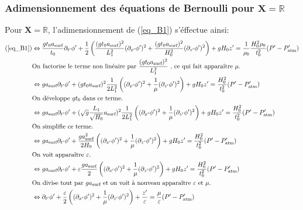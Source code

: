 \documentclass[12pt,a4paper]{article}
\numberwithin{equation}{section}
\begin{document}
\subsubsection{Adimensionnement des équations de Bernoulli pour $\textbf{X} = \mathbb{R}$}
Pour $\textbf{X} = \mathbb{R}$, l'adimensionnement de (\ref{eq_B1}) s'éffectue ainsi:
\begin{align}
    \text{(\ref{eq_B1})} &\Leftrightarrow \frac{g t_0 a_{\text{surf}}}{t_0}\partial_{t'} \phi' + \frac{1}{2}\left(\frac{(g t_0 a_{\text{surf}})^2}{L_1^2}(\partial_{x'}\phi')^2+ \frac{(g t_0 a_{\text{surf}})^2}{H_0^2}(\partial_{z'}\phi')^2\right) + g H_0 z' = \frac{1}{\rho_0}\frac{H_0^2\rho_0}{t_0^2}(P'-P'_{\text{atm}}) \nonumber\\
    &\text{On factorise le terme non linéaire par $ \frac{(g t_0 a_{\text{surf}})^2 }{L_1^2}$ , ce qui fait apparaître $\mu$.}\nonumber\\
     &\Leftrightarrow  g  a_{\text{surf}} \partial_{t'} \phi' + (g t_0 a_{\text{surf}})^2\frac{1}{2L_1^2}\left( (\partial_{x'}\phi')^2+ \frac{1}{\mu}(\partial_{z'}\phi')^2\right) + g H_0 z' =  \frac{H_0^2  }{t_0^2}(P'-P'_{\text{atm}})\nonumber\\
     &\text{On développe $gt_0$ dans ce terme.}\nonumber\\
     &\Leftrightarrow  g  a_{\text{surf}} \partial_{t'} \phi' + 
     ( \sqrt{g}\frac{L_1}{\sqrt{H_0}} a_{\text{surf}})^2
     \frac{1}{2L_1^2}
     \left( (\partial_{x'}\phi')^2+ \frac{1}{\mu}(\partial_{z'}\phi')^2\right) 
     + g H_0 z' 
     = \frac{H_0^2 }{t_0^2}(P'-P'_{\text{atm}})\nonumber\\
     &\text{On simplifie ce terme.}\nonumber\\
    &\Leftrightarrow  g  a_{\text{surf}} \partial_{t'} \phi' + 
     \frac{g a_{\text{surf}}^2}{2H_0}
     \left( (\partial_{x'}\phi')^2+ \frac{1}{\mu}(\partial_{z'}\phi')^2\right) 
     + g H_0 z' 
     = \frac{H_0^2  }{t_0^2}(P'-P'_{\text{atm}})\nonumber\\
     &\text{On voit apparaître $\varepsilon$.}\nonumber\\
     &\Leftrightarrow  g  a_{\text{surf}} \partial_{t'} \phi' + 
     \varepsilon\frac{g a_{\text{surf}}}{2}
     \left( (\partial_{x'}\phi')^2+ \frac{1}{\mu}(\partial_{z'}\phi')^2\right) 
     + g H_0 z' 
     = \frac{H_0^2 }{t_0^2}(P'-P'_{\text{atm}})\nonumber\\
     &\text{On divise tout par $g  a_{\text{surf}}$ et on voit à nouveau apparaître $\varepsilon$ et $\mu$}. \nonumber\\
     &\Leftrightarrow   \partial_{t'} \phi' + 
     \frac{\varepsilon}{2}
     \left( (\partial_{x'}\phi')^2+ \frac{1}{\mu}(\partial_{z'}\phi')^2\right) 
     + \frac{z'}{\varepsilon} 
     = \frac{\mu}{\varepsilon}(P'-P'_{\text{atm}}) \label{eq_B1_adim}
\end{align}
\\
\end{document}
